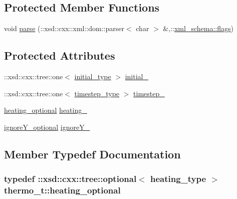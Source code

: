 \subsection*{Protected Member Functions}
\begin{DoxyCompactItemize}
\item 
void \hyperlink{classthermo__t_ad904ca357fb42ae48a78d887fecf1f00}{parse} (\+::xsd\+::cxx\+::xml\+::dom\+::parser$<$ char $>$ \&,\+::\hyperlink{namespacexml__schema_a0612287d030cb2732d31a45b258fdc87}{xml\+\_\+schema\+::flags})
\end{DoxyCompactItemize}
\subsection*{Protected Attributes}
\begin{DoxyCompactItemize}
\item 
\+::xsd\+::cxx\+::tree\+::one$<$ \hyperlink{classthermo__t_a3b889c80ce97870a6967ebee963438ed}{initial\+\_\+type} $>$ \hyperlink{classthermo__t_a44b9944e39c14f6ad14dc4367b913e17}{initial\+\_\+}
\item 
\+::xsd\+::cxx\+::tree\+::one$<$ \hyperlink{classthermo__t_a6895e9b201424e2fada14df933774b0c}{timestep\+\_\+type} $>$ \hyperlink{classthermo__t_a81482a5b9787aef0293b763d929cfc31}{timestep\+\_\+}
\item 
\hyperlink{classthermo__t_a07769e3087269c95ee4fc162c6bf4341}{heating\+\_\+optional} \hyperlink{classthermo__t_a416f5bd41ef13d1b555d7c441e47ec94}{heating\+\_\+}
\item 
\hyperlink{classthermo__t_a95e0efa769cf6e41e4851c821fde82a9}{ignore\+Y\+\_\+optional} \hyperlink{classthermo__t_a25f092948e00faf10758e74c3930cbcf}{ignore\+Y\+\_\+}
\end{DoxyCompactItemize}


\subsection{Member Typedef Documentation}
\subsubsection[{\texorpdfstring{heating\+\_\+optional}{heating_optional}}]{\setlength{\rightskip}{0pt plus 5cm}typedef \+::xsd\+::cxx\+::tree\+::optional$<$ {\bf heating\+\_\+type} $>$ {\bf thermo\+\_\+t\+::heating\+\_\+optional}}\hypertarget{classthermo__t_a07769e3087269c95ee4fc162c6bf4341}{}\label{classthermo__t_a07769e3087269c95ee4fc162c6bf4341}

